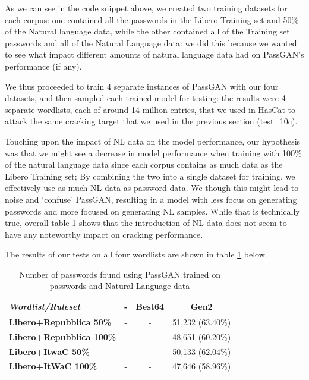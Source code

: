 As we can see in the code snippet above, we created two training datasets for each corpus: one contained all the passwords in the Libero Training set and 50\% of the Natural language data, while the other contained all of the Training set passwords and all of the Natural Language data: we did this because we wanted to see what impact different amounts of natural language data had on PassGAN's performance (if any).

We thus proceeded to train 4 separate instances of PassGAN with our four datasets, and then sampled each trained model for testing: the results were 4 separate wordlists, each of around 14 million entries, that we used in HasCat to attack the same cracking target that we used in the previous section (test\_10c).


Touching upon the impact of NL data on the model performance, our hypothesis was that we might see a decrease in model performance when training with 100\% of the natural language data since each corpus contains as much data as the Libero Training set; By combining the two into a single dataset for training, we effectively use as much NL data as password data.  We though this might lead to noise and ‘confuse’ PassGAN, resulting in a model with less focus on generating passwords and more focused on generating NL samples. While that is technically true, overall table \ref{tab:nl-results} shows that the introduction of NL data does not seem to have any noteworthy impact on cracking performance.

The results of our tests on all four wordlists are shown in table \ref{tab:nl-results} below.

\begin{table}[H]
\centering
\begin{tabular}{|l|c|c|c|}
\hline
 \textbf{\emph{Wordlist/Ruleset}} & \textbf{-} & \textbf{Best64} & \textbf{Gen2} \\ \hline
 \textbf{Libero+Repubblica 50\%} & - & - & 51,232 (63.40\%) \\ \hline
 \textbf{Libero+Repubblica 100\%} & - & - &  48,651 (60.20\%) \\ \hline
 \textbf{Libero+ItwaC 50\%} & - & - &  50,133 (62.04\%) \\ \hline
 \textbf{Libero+ItWaC 100\%} & - & - &  47,646 (58.96\%) \\ \hline
\end{tabular}
\caption{Number of passwords found using PassGAN trained on passwords and Natural Language data}
\label{tab:nl-results}
\end{table}

